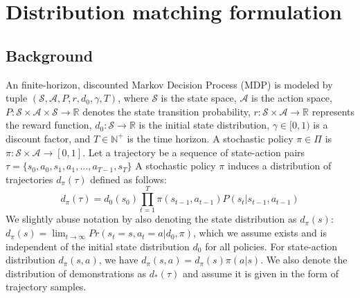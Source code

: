 \section{Distribution matching formulation}

\subsection{Background}
An finite-horizon, discounted Markov Decision Process (MDP) is modeled by tuple $(\mathcal{S} , \mathcal{A}, P, r , d_0, \gamma, T)$, where $\mathcal{S}$ is the state space, $\mathcal{A}$ is the action space, $P:\mathcal{S}\times\mathcal{A}\times\mathcal{S}\rightarrow \mathbb{R}$ denotes the state transition probability, $r:\mathcal{S}\times\mathcal{A}\rightarrow\mathbb{R}$ represents the reward function, $d_0:\mathcal{S} \rightarrow\mathbb{R}$ is the initial state distribution, $\gamma\in[0, 1)$ is a discount factor, and $T\in \mathbb{N}^+$ is the time horizon.
A stochastic policy $\pi\in\Pi$ is $\pi: \mathcal{S}\times\mathcal{A}\rightarrow [0, 1]$.
Let a trajectory be a sequence of state-action pairs $\tau=\{s_0, a_0, s_1, a_1, ..., a_{T-1}, s_T\}$
A stochastic policy $\pi$ induces a  distribution of trajectories $d_{\pi}(\tau)$ defined as follows:
\begin{equation}\label{equ:d_pi_definition}
d_{\pi}(\tau) = d_0(s_0)\prod_{t=1}^{T}\pi(s_{t-1}, a_{t-1})P(s_{t}|s_{t-1}, a_{t-1})
\end{equation}
We slightly abuse notation by also denoting the state distribution as $d_\pi(s)$: $d_{\pi}(s) =\lim_{t\rightarrow\infty}Pr(s_t=s, a_t=a|d_0, \pi)$, 
which we assume exists and is independent of the initial state distribution $d_0$ for all policies. 
For state-action distribution $d_{\pi}(s, a)$, we have $d_{\pi}(s, a) = d_{\pi}(s)\pi(a|s)$. 
We also denote the distribution of demonstrations as $d_{*}(\tau)$ and assume it is given in the form of trajectory samples. 

